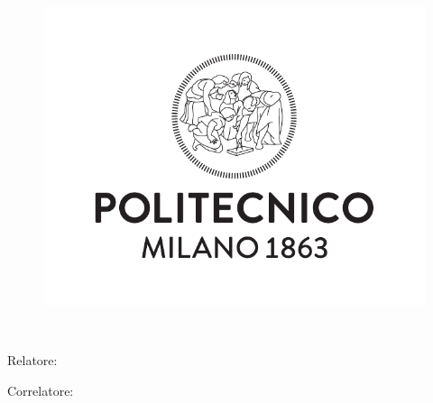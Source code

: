 \begin{titlepage}
    \begin{center}
    	\large
        \spacedlowsmallcaps{\myUni} \\
        \bigskip\myFaculty \\
        \medskip\mySchool \\
    	\medskip\myDepartment \\
    	\bigskip\myCourseFirstPartIT \\
        \medskip\myCourseSecondPartIT \\  

        \hfill

        \vfill
        
        \begin{figure}[!h]
			\begin{center}
				\includegraphics[width=0.3\columnwidth]{Images/logoPoli.pdf}
			\end{center}
		\end{figure}
		
		\vfill

        \begingroup
       		\huge	
            \color{Maroon} \myTitleIT \\ \bigskip
        \endgroup

        \vfill

		\flushleft 
		\normalsize{Relatore:}\\
		\medskip\spacedlowsmallcaps{\mySupervisor}

		\flushleft
		\normalsize{Correlatore:}\\
		\medskip\spacedlowsmallcaps{\myOtherSupervisor}\\
        

\end{center}
\end{titlepage}
